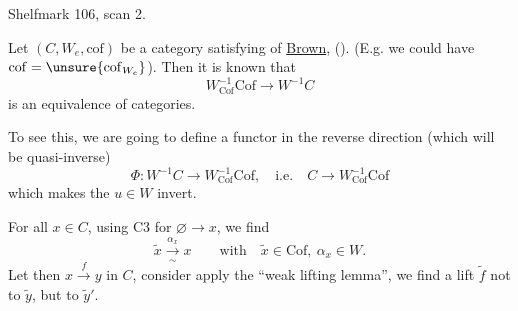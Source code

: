 Shelfmark 106, scan 2.

Let $(C,W_e,\mathrm{cof})$ be a category satisfying  of \uline{Brown}, ().
(E.g. we could have $\mathrm{cof}=\unsure{\mathrm{cof}_{W_e}}$). Then it is known that
\[
W_{\mathrm{Cof}}^{-1}\mathrm{Cof}\longrightarrow W^{-1}C
\]
is an equivalence of categories.

To see this, we are going to define a functor in the reverse direction (which will be quasi-inverse)
\[
\Phi:W^{-1}C\longrightarrow W_{\mathrm{Cof}}^{-1}\mathrm{Cof},\quad\text{i.e.}\quad C\longrightarrow W_{\mathrm{Cof}}^{-1}\mathrm{Cof}
\]
which makes the $u\in W$ invert.

For all $x\in C$, using C3 for $\varnothing\longrightarrow x$, we find
\[
\tilde x\xrightarrow[\sim]{\alpha_x}x\qquad\text{with}\quad \tilde x\in\mathrm{Cof},\ \alpha_x\in W.
\]
Let then $x\xrightarrow{f}y$ in $C$,
consider
apply the ``weak lifting lemma'', we find
a lift $\tilde f$    not to $\tilde y$, but to $\tilde y'$.

